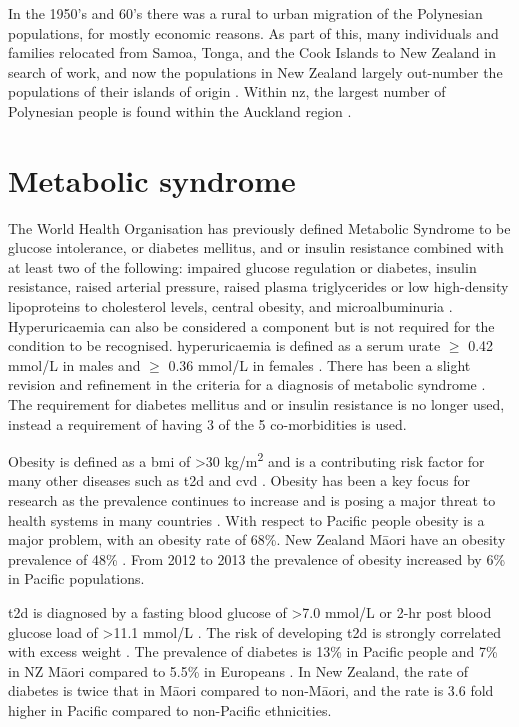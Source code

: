 \documentclass[twoside,openright]{report}
\newcommand{\tex}[1]{#1}
\begin{document}
In the 1950's and 60's there was a rural to urban migration of the
Polynesian populations, for mostly economic reasons. As part of this,
many individuals and families relocated from Samoa, Tonga, and the Cook
Islands to New Zealand in search of work, and now the populations in New
Zealand largely out-number the populations of their islands of origin
\citep{MatisooSmith2012highway}. Within \glsdesc{nz}, the largest number
of Polynesian people is found within the Auckland region
\citep{Barcham2009}.

\section{Metabolic syndrome}\label{metabolic-syndrome}

The World Health Organisation has previously defined Metabolic Syndrome
to be glucose intolerance, or diabetes mellitus, and or insulin
resistance combined with at least two of the following: impaired glucose
regulation or diabetes, insulin resistance, raised arterial pressure,
raised plasma triglycerides or low high-density lipoproteins to
cholesterol levels, central obesity, and microalbuminuria
\citep{Alberti1998}. Hyperuricaemia can also be considered a component
but is not required for the condition to be recognised. hyperuricaemia
is defined as a serum urate \(\geq\) 0.42 mmol/L in males and \(\geq\)
0.36 mmol/L in females \citep{Choi2007b}. There has been a slight
revision and refinement in the criteria for a diagnosis of metabolic
syndrome \citep{Alberti2009}. The requirement for diabetes mellitus and
or insulin resistance is no longer used, instead a requirement of having
3 of the 5 co-morbidities is used.

Obesity is defined as a \gls{bmi} of \textgreater{}30
kg/m\textsuperscript{2} and is a contributing risk factor for many other
diseases such as \gls{t2d} and \gls{cvd} \citep{Haslam2005}. Obesity has
been a key focus for research as the prevalence continues to increase
and is posing a major threat to health systems in many countries
\citep{Wang2011}. With respect to Pacific people obesity is a major
problem, with an obesity rate of 68\%. New Zealand M\tex{\={a}}ori have
an obesity prevalence of 48\% \citep{Health2013}. From 2012 to 2013 the
prevalence of obesity increased by 6\% in Pacific populations.

\Gls{t2d} is diagnosed by a fasting blood glucose of \textgreater{}7.0
mmol/L or 2-hr post blood glucose load of \textgreater{}11.1 mmol/L
\citep{Alberti1998}. The risk of developing \gls{t2d} is strongly
correlated with excess weight \citep{Rana2007}. The prevalence of
diabetes is 13\% in Pacific people and 7\% in NZ M\tex{\={a}}ori
\citep{Health2013} compared to 5.5\% in Europeans \citep{Winnard2013}.
In New Zealand, the rate of diabetes is twice that in M\tex{\={a}}ori
compared to non-M\tex{\={a}}ori, and the rate is 3.6 fold higher in
Pacific compared to non-Pacific ethnicities.
\end{document}
